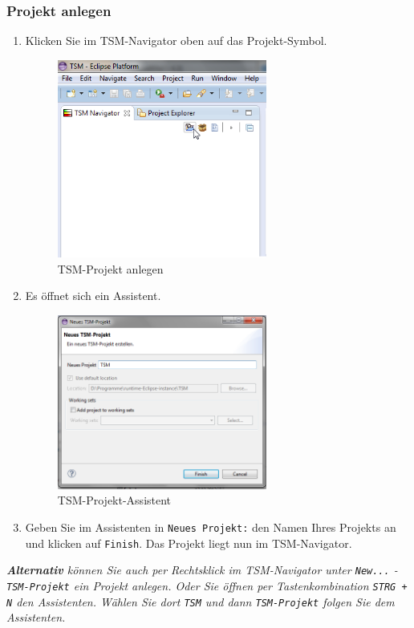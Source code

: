 \documentclass[11pt,a4paper,titlepage]{article}
\begin{document}
\subsubsection{Projekt anlegen}
\begin{enumerate}
\item Klicken Sie im TSM-Navigator oben auf das Projekt-Symbol.
\begin{figure}[H]
\centering
\includegraphics[width= 260px]{BilderHandbuchTSMNavigator/Projekt/Projekt.png}
\caption{TSM-Projekt anlegen}
\label{fig:Projekt}
\end{figure}
\item Es öffnet sich ein Assistent.

\begin{figure}[H]
\centering
\includegraphics[width= 260px]{BilderHandbuchTSMNavigator/Projekt/ProjektAssistent.png}
\caption{TSM-Projekt-Assistent}
\label{fig:Projekt}
\end{figure}

\item Geben Sie im Assistenten in \texttt{Neues Projekt:} den Namen Ihres Projekts an und klicken auf \texttt{Finish}. Das Projekt liegt nun im TSM-Navigator.
\end{enumerate}
\textit{\textbf{Alternativ} können Sie auch per Rechtsklick im TSM-Navigator unter \texttt{New...} - \texttt{TSM-Projekt} ein Projekt anlegen.
Oder Sie öffnen per Tastenkombination \texttt{STRG + N} den Assistenten. Wählen Sie dort \texttt{TSM} und dann \texttt{TSM-Projekt} folgen Sie dem Assistenten.}
\end{document}
